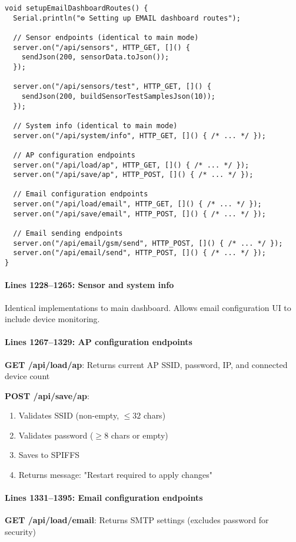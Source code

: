 \documentclass[11pt,a4paper]{article}
\begin{document}
\begin{verbatim}
void setupEmailDashboardRoutes() {
  Serial.println("⚙ Setting up EMAIL dashboard routes");
  
  // Sensor endpoints (identical to main mode)
  server.on("/api/sensors", HTTP_GET, []() {
    sendJson(200, sensorData.toJson());
  });

  server.on("/api/sensors/test", HTTP_GET, []() {
    sendJson(200, buildSensorTestSamplesJson(10));
  });
  
  // System info (identical to main mode)
  server.on("/api/system/info", HTTP_GET, []() { /* ... */ });
  
  // AP configuration endpoints
  server.on("/api/load/ap", HTTP_GET, []() { /* ... */ });
  server.on("/api/save/ap", HTTP_POST, []() { /* ... */ });
  
  // Email configuration endpoints
  server.on("/api/load/email", HTTP_GET, []() { /* ... */ });
  server.on("/api/save/email", HTTP_POST, []() { /* ... */ });
  
  // Email sending endpoints
  server.on("/api/email/gsm/send", HTTP_POST, []() { /* ... */ });
  server.on("/api/email/send", HTTP_POST, []() { /* ... */ });
}
\end{verbatim}

\paragraph{Lines 1228--1265: Sensor and system info}
Identical implementations to main dashboard. Allows email configuration UI to include device monitoring.

\paragraph{Lines 1267--1329: AP configuration endpoints}
\textbf{GET /api/load/ap}: Returns current AP SSID, password, IP, and connected device count

\textbf{POST /api/save/ap}:
\begin{enumerate}[leftmargin=*]
  \item Validates SSID (non-empty, $\leq 32$ chars)
  \item Validates password ($\geq 8$ chars or empty)
  \item Saves to SPIFFS
  \item Returns message: "Restart required to apply changes"
\end{enumerate}

\paragraph{Lines 1331--1395: Email configuration endpoints}
\textbf{GET /api/load/email}: Returns SMTP settings (excludes password for security)
\end{document}
